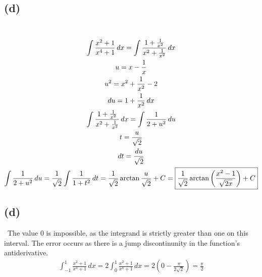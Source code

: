 \documentclass[12pt]{article}
\newcommand*{\paren}[1]{\ensuremath\left(#1\right)}
\newcommand{\subproblem}[1]{\subsection{(#1)} \,}
\begin{document}
\subproblem{d}
\begin{gather*}
    \int \frac{x^2+1}{x^4+1} \, dx=\int \frac{1+\frac{1}{x^2}}{x^2+\frac{1}{x^2}}\, dx\\
    u=x-\frac{1}{x}\\
    u^2=x^2+\frac{1}{x^2}-2\\
    du=1+\frac{1}{x^2}\, dx\\
    \int \frac{1+\frac{1}{x^2}}{x^2+\frac{1}{x^2}}\, dx = \int \frac{1}{2+u^2} \, du\\
    t= \frac{u}{\sqrt{2}}\\
    dt = \frac{du}{\sqrt{2}}\\
    \int \frac{1}{2+u^2} \, du = \frac{1}{\sqrt{2}}\int \frac{1}{1+t^2}\, dt = \frac{1}{\sqrt{2}}\arctan \frac{u}{\sqrt{2}}+C = \boxed{\frac{1}{\sqrt{2}}\arctan \paren{\frac{x^2-1}{\sqrt{2x}}}+C}
\end{gather*}

\subproblem{d}
The value 0 is impossible, as the integrand is strictly greater than one on this interval. The error occurs as there is a jump discontinunity in the function's antiderivative.
\begin{gather*}
    \int_{-1}^1\frac{x^2+1}{x^4+1}\, dx=2\int_0^1 \frac{x^2+1}{x^4+1}\, dx=2 (0- \frac{\pi}{2\sqrt{2}})=\boxed{\frac{\pi}{2}}
\end{gather*}
\end{document}
